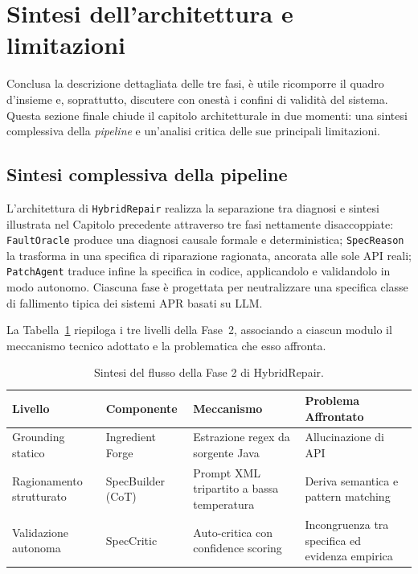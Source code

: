 \section{Sintesi dell'architettura e limitazioni}
\label{sec:discussione-architettura}

Conclusa la descrizione dettagliata delle tre fasi, è utile ricomporre il quadro
d'insieme e, soprattutto, discutere con onestà i confini di validità del sistema.
Questa sezione finale chiude il capitolo architetturale in due momenti: una sintesi
complessiva della \textit{pipeline} e un'analisi critica delle sue principali limitazioni.

\subsection{Sintesi complessiva della pipeline}

L'architettura di \texttt{HybridRepair} realizza la separazione tra diagnosi e sintesi
illustrata nel Capitolo precedente attraverso tre fasi nettamente disaccoppiate:
\texttt{FaultOracle} produce una diagnosi causale formale e deterministica;
\texttt{SpecReason} la trasforma in una specifica di riparazione ragionata, ancorata alle
sole API reali; \texttt{PatchAgent} traduce infine la specifica in codice, applicandolo e
validandolo in modo autonomo. Ciascuna fase è progettata per neutralizzare una specifica
classe di fallimento tipica dei sistemi APR basati su LLM.

La Tabella~\ref{tab:sintesi_fase_2} riepiloga i tre livelli della Fase~2, associando a
ciascun modulo il meccanismo tecnico adottato e la problematica che esso affronta.

\begin{table}[H]
\centering
\begin{tabularx}{\textwidth}{ll >{\raggedright\arraybackslash}X >{\raggedright\arraybackslash}X}
\toprule
\textbf{Livello} & \textbf{Componente} & \textbf{Meccanismo} & \textbf{Problema Affrontato} \\
\midrule
Grounding statico & Ingredient Forge & Estrazione regex da sorgente Java & Allucinazione di API \\
Ragionamento strutturato & SpecBuilder (CoT) & Prompt XML tripartito a bassa temperatura & Deriva semantica e pattern matching \\
Validazione autonoma & SpecCritic & Auto-critica con confidence scoring & Incongruenza tra specifica ed evidenza empirica \\
\bottomrule
\end{tabularx}
\caption{Sintesi del flusso della Fase 2 di HybridRepair.}
\label{tab:sintesi_fase_2}
\end{table}

